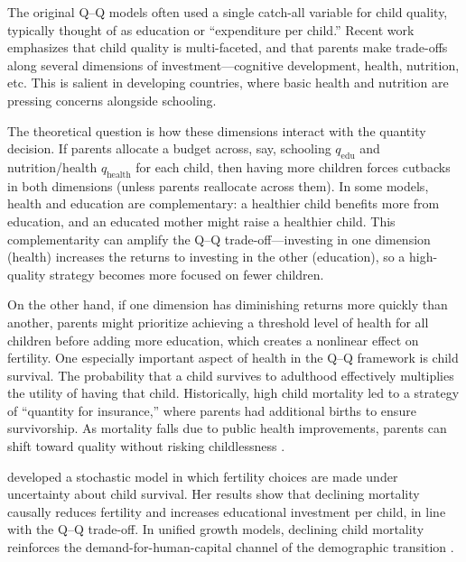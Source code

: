 \documentclass[]{AEA}
\begin{document}
The original Q--Q models often used a single catch-all variable for
child quality, typically thought of as education or ``expenditure per
child.'' Recent work emphasizes that child quality is multi-faceted, and
that parents make trade-offs along several dimensions of
investment---cognitive development, health, nutrition, etc. This is
salient in developing countries, where basic health and nutrition are
pressing concerns alongside schooling.

The theoretical question is how these dimensions interact with the
quantity decision. If parents allocate a budget across, say, schooling
\(q_{\text{edu}}\) and nutrition/health \(q_{\text{health}}\) for each
child, then having more children forces cutbacks in both dimensions
(unless parents reallocate across them). In some models, health and
education are complementary: a healthier child benefits more from
education, and an educated mother might raise a healthier child. This
complementarity can amplify the Q--Q trade-off---investing in one
dimension (health) increases the returns to investing in the other
(education), so a high-quality strategy becomes more focused on fewer
children.

On the other hand, if one dimension has diminishing returns more quickly
than another, parents might prioritize achieving a threshold level of
health for all children before adding more education, which creates a
nonlinear effect on fertility. One especially important aspect of health
in the Q--Q framework is child survival. The probability that a child
survives to adulthood effectively multiplies the utility of having that
child. Historically, high child mortality led to a strategy of
``quantity for insurance,'' where parents had additional births to
ensure survivorship. As mortality falls due to public health
improvements, parents can shift toward quality without risking
childlessness \citep{kalemli2002does, kalemli2000mortality}.

\citet{kalemli2002does} developed a stochastic model in which fertility
choices are made under uncertainty about child survival. Her results
show that declining mortality causally reduces fertility and increases
educational investment per child, in line with the Q--Q trade-off. In
unified growth models, declining child mortality reinforces the
demand-for-human-capital channel of the demographic transition
\citep{galor2004physical}.
\end{document}
